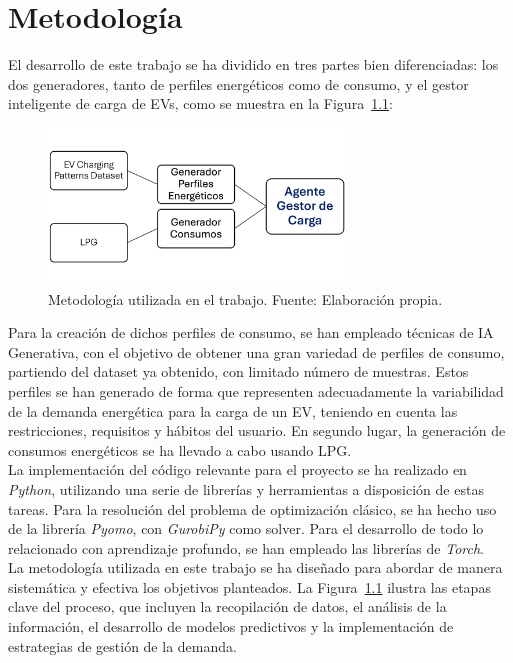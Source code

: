 \chapter{Metodología}
El desarrollo de este trabajo se ha dividido en tres partes bien diferenciadas: los dos generadores,
tanto de perfiles energéticos como de consumo, y el gestor inteligente de carga de EVs, como se
muestra en la Figura~\ref{fig:metodologia}:
\begin{figure}[ht]
    \centering
    \includegraphics[width=0.7\textwidth]{images/metodologia.png}
    \caption{Metodología utilizada en el trabajo. Fuente: Elaboración propia.}
    \label{fig:metodologia}
\end{figure}

Para la creación de dichos perfiles de consumo, se han empleado técnicas de IA Generativa, con el 
objetivo de obtener una gran variedad de perfiles de consumo, partiendo del dataset ya obtenido, 
con limitado número de muestras. Estos perfiles se han generado de forma que representen 
adecuadamente la variabilidad de la demanda energética para la carga de un EV, teniendo en cuenta
las restricciones, requisitos y hábitos del usuario. En segundo lugar, la generación de consumos 
energéticos se ha llevado a cabo usando LPG.\\

La implementación del código relevante para el proyecto se ha realizado en \textit{Python}\cite{python2024language},
utilizando una serie de librerías y herramientas a disposición de estas 
tareas. Para la resolución del problema de optimización clásico, se ha hecho uso de la librería 
\textit{Pyomo}\cite{pyomo2024}, con \textit{GurobiPy}\cite{gurobi2024} como solver. Para el 
desarrollo de todo lo relacionado con aprendizaje profundo, se han empleado las librerías de 
\textit{Torch}\cite{paszke2019pytorch}.\\

La metodología utilizada en este trabajo se ha diseñado para abordar de manera sistemática y 
efectiva los objetivos planteados. La Figura~\ref{fig:metodologia} ilustra las etapas clave del 
proceso, que incluyen la recopilación de datos, el análisis de la información, el desarrollo de 
modelos predictivos y la implementación de estrategias de gestión de la demanda.\\
